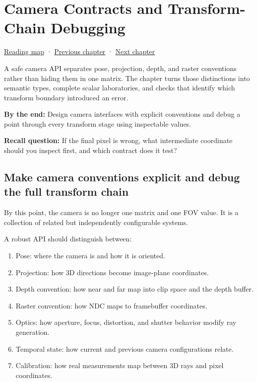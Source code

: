 \hypertarget{02-foundations-ii-ch037}{}
\chapter{Camera Contracts and Transform-Chain Debugging}\label{stagechapter:02-foundations-ii-ch037}\label{02-foundations-ii-ch037-camera-contracts-and-transform-chain-debugging}

\hyperref[volume-reading-map]{Reading map} · \hyperref[02-foundations-ii-ch036-exposure-physical-optics-and-depth-of-field]{Previous chapter} · \hyperref[02-foundations-ii-ch038-reconstruct-the-complete-geometry-pipeline]{Next chapter}

A safe camera API separates pose, projection, depth, and raster conventions rather than hiding them in one matrix. The chapter turns those distinctions into semantic types, complete scalar laboratories, and checks that identify which transform boundary introduced an error.

\textbf{By the end:} Design camera interfaces with explicit conventions and debug a point through every transform stage using inspectable values.

\textbf{Recall question:} If the final pixel is wrong, what intermediate coordinate should you inspect first, and which contract does it test?

\section{Make camera conventions explicit and debug the full transform chain}\label{02-foundations-ii-ch037-make-camera-conventions-explicit-and-debug-the-full-transform-chain}

By this point, the camera is no longer one matrix and one FOV value. It is a collection of related but independently configurable systems.

A robust API should distinguish between:

\begin{enumerate}
\def\labelenumi{\arabic{enumi}.}
\tightlist
\item
  Pose: where the camera is and how it is oriented.
\item
  Projection: how 3D directions become image-plane coordinates.
\item
  Depth convention: how near and far map into clip space and the depth buffer.
\item
  Raster convention: how NDC maps to framebuffer coordinates.
\item
  Optics: how aperture, focus, distortion, and shutter behavior modify ray generation.
\item
  Temporal state: how current and previous camera configurations relate.
\item
  Calibration: how real measurements map between 3D rays and pixel coordinates.
\end{enumerate}

